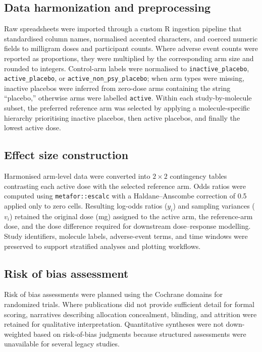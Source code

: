 \subsection{Data harmonization and preprocessing}
Raw spreadsheets were imported through a custom R ingestion pipeline that standardised column names, normalised accented characters, and coerced numeric fields to milligram doses and participant counts. Where adverse event counts were reported as proportions, they were multiplied by the corresponding arm size and rounded to integers. Control-arm labels were normalised to \texttt{inactive\_placebo}, \texttt{active\_placebo}, or \texttt{active\_non\_psy\_placebo}; when arm types were missing, inactive placebos were inferred from zero-dose arms containing the string ``placebo,'' otherwise arms were labelled \texttt{active}. Within each study-by-molecule subset, the preferred reference arm was selected by applying a molecule-specific hierarchy prioritising inactive placebos, then active placebos, and finally the lowest active dose.

\subsection{Effect size construction}
Harmonised arm-level data were converted into $2\times2$ contingency tables contrasting each active dose with the selected reference arm. Odds ratios were computed using \texttt{metafor::escalc} with a Haldane--Anscombe correction of 0.5 applied only to zero cells. Resulting log-odds ratios ($y_i$) and sampling variances ($v_i$) retained the original dose (mg) assigned to the active arm, the reference-arm dose, and the dose difference required for downstream dose--response modelling. Study identifiers, molecule labels, adverse-event terms, and time windows were preserved to support stratified analyses and plotting workflows.

\subsection{Risk of bias assessment}
Risk of bias assessments were planned using the Cochrane domains for randomized trials. Where publications did not provide sufficient detail for formal scoring, narratives describing allocation concealment, blinding, and attrition were retained for qualitative interpretation. Quantitative syntheses were not down-weighted based on risk-of-bias judgments because structured assessments were unavailable for several legacy studies.


